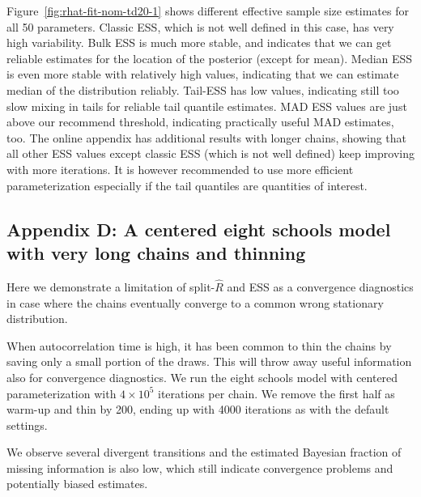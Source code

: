 \documentclass[american,]{article}
\theoremstyle{definition}
\begin{document}
Figure~\ref{fig:rhat-fit-nom-td20-1} shows different effective sample
size estimates for all 50 parameters. Classic ESS, which is not well
defined in this case, has very high variability. Bulk ESS is much more
stable, and indicates that we can get reliable estimates for the
location of the posterior (except for mean). Median ESS is even more
stable with relatively high values, indicating that we can estimate
median of the distribution reliably. Tail-ESS has low values,
indicating still too slow mixing in tails for reliable tail quantile
estimates. MAD ESS values are just above our recommend threshold,
indicating practically useful MAD estimates, too. The online appendix
has additional results with longer chains, showing that all other ESS
values except classic ESS (which is not well defined) keep improving
with more iterations. It is however recommended to use more efficient
parameterization especially if the tail quantiles are quantities of
interest.


\hypertarget{a-centered-eight-schools-model-1}{%
\subsection*{Appendix D: A centered eight schools model with very long chains and
thinning}\label{a-centered-eight-schools-model-1}}


Here we demonstrate a limitation of split-\(\widehat{R}\) and ESS as a
convergence diagnostics in case where the chains eventually converge
to a common wrong stationary distribution.

When autocorrelation time is high, it has been common to thin the
chains by saving only a small portion of the draws. This will throw
away useful information also for convergence diagnostics. We run the
eight schools model with centered parameterization with $4\times 10^5$
iterations per chain. We remove the first half as warm-up and thin by
200, ending up with 4000 iterations as with the default settings.

We observe several divergent transitions and the estimated Bayesian
fraction of missing information is also low, which still indicate
convergence problems and potentially biased estimates.
\end{document}
